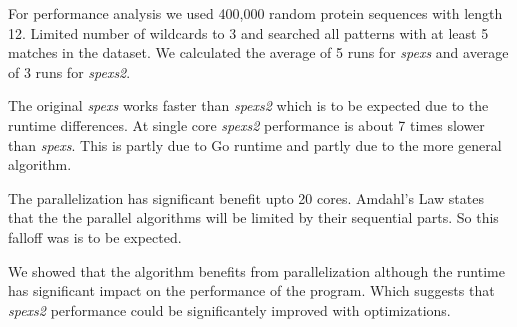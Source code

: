 For performance analysis we used 400,000 random protein sequences with length 12. Limited number of wildcards to 3 and searched all patterns with at least 5 matches in the dataset. We calculated the average of 5 runs for \emph{spexs} and average of 3 runs for \emph{spexs2}.

\begin{figure}[H]
\end{figure}

The original \emph{spexs} works faster than \emph{spexs2} which is to be expected due to the runtime differences. At single core \emph{spexs2} performance is about 7 times slower than \emph{spexs}. This is partly due to Go runtime and partly due to the more general algorithm.

The parallelization has significant benefit upto 20 cores. Amdahl's Law \cite{AmdahlsReval} states that the the parallel algorithms will be limited by their sequential parts. So this falloff was is to be expected.

We showed that the algorithm benefits from parallelization although the runtime has significant impact on the performance of the program. Which suggests that \emph{spexs2} performance could be significantely improved with optimizations.